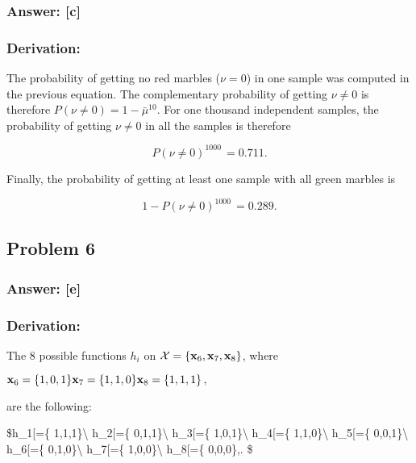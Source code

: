 \documentclass[11pt]{article}
\begin{document}
\hypertarget{answer-c}{%
\subsubsection{Answer: {[}c{]}}\label{answer-c}}

\hypertarget{derivation}{%
\subsubsection{Derivation:}\label{derivation}}

The probability of getting no red marbles (\(\nu=0\)) in one sample was
computed in the previous equation. The complementary probability of
getting \(\nu\neq 0\) is therefore \(P(\nu\neq 0)=1-\bar{\mu}^{10}\).
For one thousand independent samples, the probability of getting
\(\nu\neq 0\) in all the samples is therefore

\[P(\nu\neq 0)^{1000}\,=0.711.\]

Finally, the probability of getting at least one sample with all green
marbles is

\[1-P(\nu\neq 0)^{1000}\,=0.289.\]

    \hypertarget{problem-6}{%
\subsection{Problem 6}\label{problem-6}}

\hypertarget{answer-e}{%
\subsubsection{Answer: {[}e{]}}\label{answer-e}}

\hypertarget{derivation}{%
\subsubsection{Derivation:}\label{derivation}}

The 8 possible functions \(h_i\) on
\(\mathcal{X}=\{{\bf x}_6,{\bf x}_7,{\bf x}_8\}\), where

\({\bf x}_6=\{ 1,0,1\}\\ {\bf x}_7=\{ 1,1,0\}\\ {\bf x}_8=\{ 1,1,1\}\,,\)

are the following:

\$h\_1{[}\mathcal{X}{]}=\{ 1,1,1\}\textbackslash{}
h\_2{[}\mathcal{X}{]}=\{ 0,1,1\}\textbackslash{}
h\_3{[}\mathcal{X}{]}=\{ 1,0,1\}\textbackslash{}
h\_4{[}\mathcal{X}{]}=\{ 1,1,0\}\textbackslash{}
h\_5{[}\mathcal{X}{]}=\{ 0,0,1\}\textbackslash{}
h\_6{[}\mathcal{X}{]}=\{ 0,1,0\}\textbackslash{}
h\_7{[}\mathcal{X}{]}=\{ 1,0,0\}\textbackslash{}
h\_8{[}\mathcal{X}{]}=\{ 0,0,0\},. \$
\end{document}
